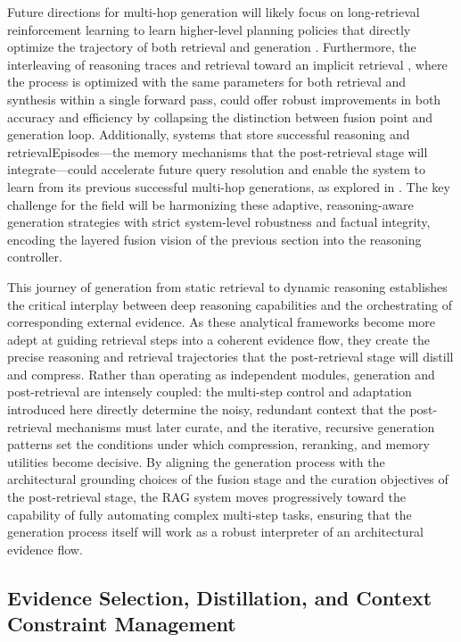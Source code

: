 \documentclass[11pt,a4paper]{article}
\begin{document}
Future directions for multi-hop generation will likely focus on long-retrieval reinforcement learning to learn higher-level planning policies that directly optimize the trajectory of both retrieval and generation \cite{arxiv:2505.03452v3}. Furthermore, the interleaving of reasoning traces and retrieval toward an implicit retrieval \cite{arxiv:2506.02279v2}, where the process is optimized with the same parameters for both retrieval and synthesis within a single forward pass, could offer robust improvements in both accuracy and efficiency by collapsing the distinction between fusion point and generation loop. Additionally, systems that store successful reasoning and retrievalEpisodes---the memory mechanisms that the post-retrieval stage will integrate---could accelerate future query resolution and enable the system to learn from its previous successful multi-hop generations, as explored in \cite{arxiv:2603.01783v1}. The key challenge for the field will be harmonizing these adaptive, reasoning-aware generation strategies with strict system-level robustness and factual integrity, encoding the layered fusion vision of the previous section into the reasoning controller.

This journey of generation from static retrieval to dynamic reasoning establishes the critical interplay between deep reasoning capabilities and the orchestrating of corresponding external evidence. As these analytical frameworks become more adept at guiding retrieval steps into a coherent evidence flow, they create the precise reasoning and retrieval trajectories that the post-retrieval stage will distill and compress. Rather than operating as independent modules, generation and post-retrieval are intensely coupled: the multi-step control and adaptation introduced here directly determine the noisy, redundant context that the post-retrieval mechanisms must later curate, and the iterative, recursive generation patterns set the conditions under which compression, reranking, and memory utilities become decisive. By aligning the generation process with the architectural grounding choices of the fusion stage and the curation objectives of the post-retrieval stage, the RAG system moves progressively toward the capability of fully automating complex multi-step tasks, ensuring that the generation process itself will work as a robust interpreter of an architectural evidence flow.


\subsection{Evidence Selection, Distillation, and Context Constraint Management}
\end{document}

